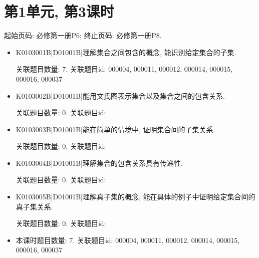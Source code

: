 \section*{第1单元, 第3课时}
起始页码: 必修第一册P6; 终止页码: 必修第一册P8.
\begin{itemize}
\item K0103001B|D01001B|理解集合之间包含的概念, 能识别给定集合的子集.

关联题目数量: 7. 关联题目id: 000004, 000011, 000012, 000014, 000015, 000016, 000037

\item K0103002B|D01001B|能用文氏图表示集合以及集合之间的包含关系.

关联题目数量: 0. 关联题目id: 

\item K0103003B|D01001B|能在简单的情境中, 证明集合间的子集关系.

关联题目数量: 0. 关联题目id: 

\item K0103004B|D01001B|理解集合的包含关系具有传递性.

关联题目数量: 0. 关联题目id: 

\item K0103005B|D01001B|理解真子集的概念, 能在具体的例子中证明给定集合间的真子集关系.

关联题目数量: 0. 关联题目id: 

\item 本课时题目数量: 7. 关联题目id: 000004, 000011, 000012, 000014, 000015, 000016, 000037

\end{itemize}

